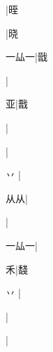 \begin{multicols}{2}
{{\cjk{}{\cnsym{}　}{\cnsym{}　}{\cnsym{}　}}|{\cjk{}晊}\par
{\cjk{}{\cnsym{}　}{\cnsym{}　}{\cnsym{}　}}|{\cjk{}晓}\par
{\cjk{}一厸一}|{\cjk{}戩}\par
{}|{}\par
{\cjk{}{\cnsym{}　}{\cnsym{}　}亚}|{\cjk{}戬}\par
{}|{}\par
{}|{}\par
{\cjk{}{\cnsym{}　}丷{\cnjzr{}}}|{}\par
{\cjk{}{\cnsym{}　}从从}|{}\par
{\cjk{}{\cnsym{}　}{\cnsym{}　}{\cnsym{}　}}|{}\par
{\cjk{}一厸一}|{}\par
{\cjk{}{\cnsym{}　}{\cnsym{}　}禾}|{\cjk{}馢}\par
{\cjk{}{\cnsym{}　}丷{\cnjzr{}}}|{}\par
{\cjk{}{\cnsym{}　}{\cnsym{}　}{\cnsym{}　}}|{}\par
{}|{}\par
}
\end{multicols}
